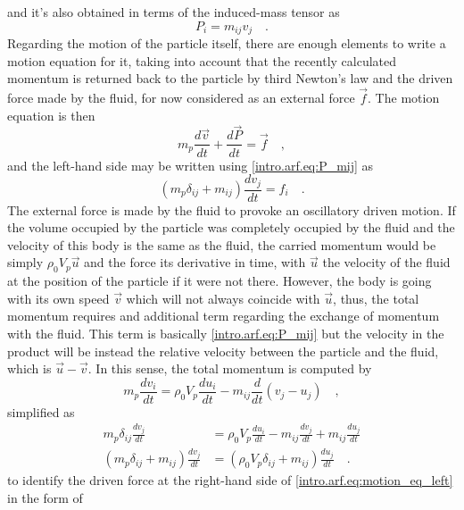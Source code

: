 and it's also obtained in terms of the induced-mass tensor as
\begin{equation}\label{intro.arf.eq:P_mij}
    P_i = m_{ij}v_j\quad.
\end{equation}
Regarding the motion of the particle itself, there are enough elements to write a motion equation for it, taking into account that the recently calculated momentum is returned back to the particle by third Newton's law and the driven force made by the fluid, for now considered as an external force $\vec f$. The motion equation is then
\begin{equation}\label{intro.arf.eq:motion_eq_left}
    m_p\frac{d\vec v}{dt} + \frac{d\vec P}{dt} = \vec f\quad,
\end{equation}
and the left-hand side may be written using \eqref{intro.arf.eq:P_mij} as
\begin{equation}\label{intro.arf.eq:motion_eq_tensor_left}
    (m_p\delta_{ij} + m_{ij})\frac{d v_j}{dt} = f_i\quad.
\end{equation}
The external force is made by the fluid to provoke an oscillatory driven motion. If the volume occupied by the particle was completely occupied by the fluid and the velocity of this body is the same as the fluid, the carried momentum would be simply $\rho_0V_p\vec u$ and the force its derivative in time, with $\vec u$ the velocity of the fluid at the position of the particle if it were not there. However, the body is going with its own speed $\vec v$ which will not always coincide with $\vec u$, thus, the total momentum requires and additional term regarding the exchange of momentum with the fluid. This term is basically \eqref{intro.arf.eq:P_mij} but the velocity in the product will be instead the relative velocity between the particle and the fluid, which is $\vec u - \vec v$. In this sense, the total momentum is computed by
\begin{equation}\label{intro.arf.eq:motion_eq_fluid}
    m_p\frac{dv_i}{dt} = \rho_0 V_p\frac{du_i}{dt} - m_{ij}\frac{d}{dt}(v_j - u_j)\quad,
\end{equation}
simplified as
\begin{align}
    m_p\delta_{ij}\frac{dv_j}{dt} &= \rho_0 V_p\frac{du_i}{dt} - m_{ij}\frac{dv_j}{dt} + m_{ij}\frac{du_j}{dt}\nonumber\\
    (m_p\delta_{ij} + m_{ij})\frac{dv_j}{dt} &=(\rho_0V_p\delta_{ij} + m_{ij})\frac{du_j}{dt}\quad.\label{intro.arf.eq:complete_eq_motion}
\end{align}
to identify the driven force at the right-hand side of \eqref{intro.arf.eq:motion_eq_left} in the form of
